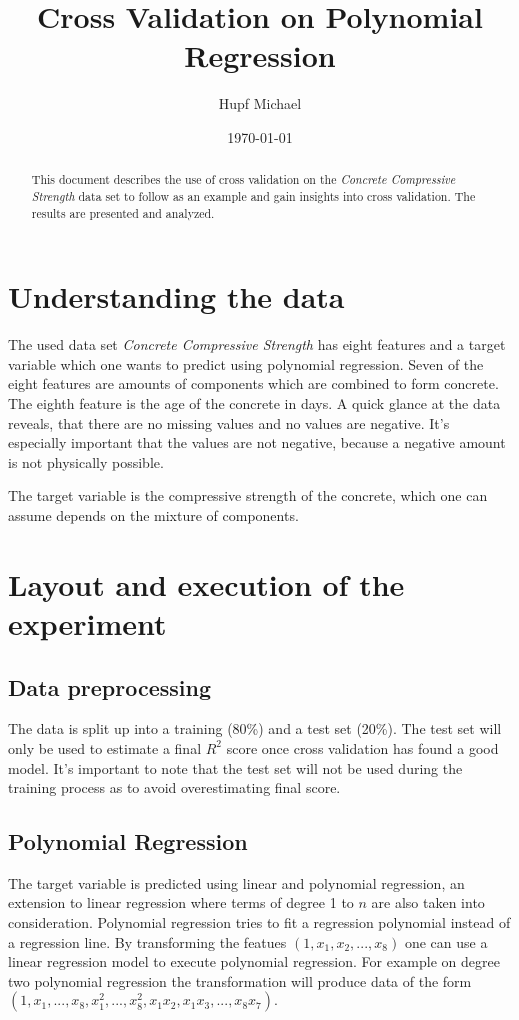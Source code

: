 \documentclass[notitlepage]{article}
\title{Cross Validation on Polynomial Regression}
\author{Hupf Michael}
\date{\today}
\begin{document}
    \maketitle 
    \begin{abstract}
        This document describes the use of cross validation on the \textit{Concrete Compressive 
        Strength} data set to follow as an example and gain insights into cross validation. 
        The results are presented and analyzed.
    \end{abstract}
    
    \section{Understanding the data}
    The used data set \textit{Concrete Compressive Strength} has eight features and a target variable
    which one wants to predict using polynomial regression. Seven of the eight features are amounts 
    of components which are combined to form concrete. The eighth feature is the age of the concrete
    in days. A quick glance at the data reveals, that there are no missing values and no values are 
    negative. It's especially important that the values are not negative, because a negative amount 
    is not physically possible.

    The target variable is the compressive strength of the concrete, which one can assume
    depends on the mixture of components.

    \section{Layout and execution of the experiment}
    \subsection{Data preprocessing}
    The data is split up into a training (80\%) and a test set (20\%). The test set will only be used
    to estimate a final $R^2$ score once cross validation has found a good model. It's important to 
    note that the test set will not be used during the training process as to avoid overestimating 
    final score. 
    \subsection{Polynomial Regression}
    The target variable is predicted using linear and polynomial regression, an extension to
    linear regression where terms of degree 1 to $n$ are also taken into consideration. Polynomial 
    regression tries to fit a regression polynomial instead of a regression line. By 
    transforming the featues $(1, x_1, x_2, ..., x_8)$ one can use a linear regression model to
    execute polynomial regression. For example on degree two polynomial regression the 
    transformation will produce data of the form 
    $(1, x_1, ..., x_8, x_1^2, ..., x_8^2, x_1x_2, x_1x_3, ..., x_8x_7).$
    
\end{document}
